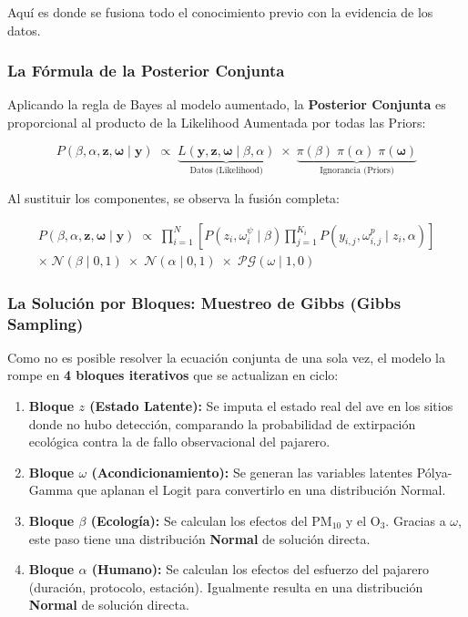 \documentclass[12pt]{article}
\begin{document}
Aquí es donde se fusiona todo el conocimiento previo con la evidencia de los datos.

\subsubsection*{La Fórmula de la Posterior Conjunta}

Aplicando la regla de Bayes al modelo aumentado, la \textbf{Posterior Conjunta} es proporcional al producto de la Likelihood Aumentada por todas las Priors:

\begin{equation}
  \boxed{
  P\!\left(\beta, \alpha, \mathbf{z}, \boldsymbol{\omega} \mid \mathbf{y}\right)
  \;\propto\;
  \underbrace{L\!\left(\mathbf{y}, \mathbf{z}, \boldsymbol{\omega} \mid \beta, \alpha\right)}_{\text{Datos (Likelihood)}}
  \;\times\;
  \underbrace{\pi(\beta)\;\pi(\alpha)\;\pi(\boldsymbol{\omega})}_{\text{Ignorancia (Priors)}}
  }
\end{equation}

Al sustituir los componentes, se observa la fusión completa:

\begin{multline}
  P\!\left(\beta, \alpha, \mathbf{z}, \boldsymbol{\omega} \mid \mathbf{y}\right)
  \;\propto\;
  \prod_{i=1}^N
  \left[
    P\!\left(z_i, \omega^\psi_i \mid \beta\right)
    \prod_{j=1}^{K_i}
    P\!\left(y_{i,j}, \omega^p_{i,j} \mid z_i, \alpha\right)
  \right] \\
  \times\;
  \mathcal{N}(\beta \mid 0, 1)
  \;\times\;
  \mathcal{N}(\alpha \mid 0, 1)
  \;\times\;
  \mathcal{PG}(\omega \mid 1, 0)
\end{multline}

\subsubsection*{La Solución por Bloques: Muestreo de Gibbs (Gibbs Sampling)}

Como no es posible resolver la ecuación conjunta de una sola vez, el modelo la rompe en \textbf{4 bloques iterativos} que se actualizan en ciclo:

\begin{enumerate}
  \item \textbf{Bloque $z$ (Estado Latente):} Se imputa el estado real del ave en los sitios donde no hubo detección, comparando la probabilidad de extirpación ecológica contra la de fallo observacional del pajarero.
  \item \textbf{Bloque $\omega$ (Acondicionamiento):} Se generan las variables latentes Pólya-Gamma que aplanan el Logit para convertirlo en una distribución Normal.
  \item \textbf{Bloque $\beta$ (Ecología):} Se calculan los efectos del $\text{PM}_{10}$ y el $\text{O}_3$. Gracias a $\omega$, este paso tiene una distribución \textbf{Normal} de solución directa.
  \item \textbf{Bloque $\alpha$ (Humano):} Se calculan los efectos del esfuerzo del pajarero (duración, protocolo, estación). Igualmente resulta en una distribución \textbf{Normal} de solución directa.
\end{enumerate}
\end{document}
